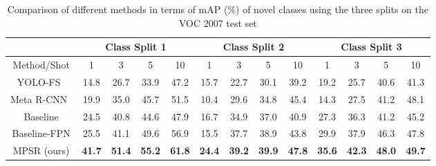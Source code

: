 \documentclass[runningheads]{llncs}
\begin{document}
\setlength{\tabcolsep}{1.7pt}
\begin{table}
	\begin{center}
		\caption{Comparison of different methods in terms of mAP (\%) of novel classes using the three splits on the VOC 2007 test set}
		\label{table:mainvoctable}
		\begin{tabular}{c|cccc|cccc|cccc}
			\hline
			& \multicolumn{4}{c|}{Class Split 1}                            & \multicolumn{4}{c|}{Class Split 2}                            & \multicolumn{4}{c}{Class Split 3}                             \\ \hline
			Method/Shot  & 1             & 3             & 5             & 10            & 1             & 3             & 5             & 10            & 1             & 3             & 5             & 10            \\ \hline
			YOLO-FS~\cite{yolore}      & 14.8          & 26.7          & 33.9          & 47.2          & 15.7          & 22.7          & 30.1          & 39.2          & 19.2          & 25.7          & 40.6          & 41.3          \\
			Meta R-CNN~\cite{metarcnn}   & 19.9          & 35.0          & 45.7          & 51.5          & 10.4          & 29.6          & 34.8          & 45.4          & 14.3          & 27.5          & 41.2          & 48.1          \\ \hline
			Baseline     & 24.5          & 40.8          & 44.6          & 47.9          & 16.7          & 34.9          & 37.0          & 40.9          & 27.3          & 36.3          & 41.2          & 45.2          \\
			Baseline-FPN & 25.5          & 41.1          & 49.6          & 56.9          & 15.5          & 37.7          & 38.9          & 43.8          & 29.9          & 37.9          & 46.3          & 47.8          \\ \hline
			MPSR (ours)  & \textbf{41.7} & \textbf{51.4} & \textbf{55.2} & \textbf{61.8} & \textbf{24.4} & \textbf{39.2} & \textbf{39.9} & \textbf{47.8} & \textbf{35.6} & \textbf{42.3} & \textbf{48.0} & \textbf{49.7} \\ \hline
		\end{tabular}
	\end{center}
\end{table}
\setlength{\tabcolsep}{1.4pt}
\end{document}
